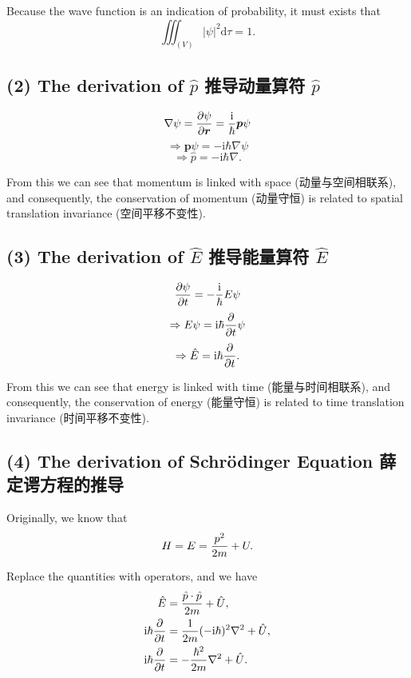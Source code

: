 Because the wave function is an indication of probability, it must exists that \[\iiint _{(V)} |\psi|^2 \mathrm d\tau=1.\]

\subsection*{(2) The derivation of \(\hat p\) 推导动量算符 \(\hat p\)}\label{the-derivation-of-hat-p-ux63a8ux5bfcux52a8ux91cfux7b97ux7b26-hat-p}

\[\nabla \psi = {\partial \psi \over \partial \boldsymbol r} = {\mathrm i \over \hbar}\boldsymbol p \psi\] \[\Rightarrow \boldsymbol p \psi = -\mathrm i \hbar \nabla \psi\] \[\Rightarrow \hat p = -\mathrm i \hbar \nabla.\]

From this we can see that momentum is linked with space (动量与空间相联系), and consequently, the conservation of momentum (动量守恒) is related to spatial translation invariance (空间平移不变性).

\subsection*{(3) The derivation of \(\hat E\) 推导能量算符 \(\hat E\)}\label{the-derivation-of-hat-e-ux63a8ux5bfcux80fdux91cfux7b97ux7b26-hat-e}

\[{\partial \psi \over \partial t} = -{\mathrm i \over \hbar}E \psi\] \[\Rightarrow E \psi = \mathrm i \hbar {\partial \over \partial t} \psi\] \[\Rightarrow \hat E = \mathrm i \hbar {\partial \over \partial t}.\]

From this we can see that energy is linked with time (能量与时间相联系), and consequently, the conservation of energy (能量守恒) is related to time translation invariance (时间平移不变性).

\subsection*{(4) The derivation of Schrödinger Equation 薛定谔方程的推导}\label{the-derivation-of-schruxf6dinger-equation-ux859bux5b9aux8c14ux65b9ux7a0bux7684ux63a8ux5bfc-1}

Originally, we know that \[H = E = {p^2 \over 2m} + U.\]

Replace the quantities with operators, and we have \begin{align*}
    \hat E & = {\hat p \cdot \hat p \over 2m} + \hat U, \\
    \mathrm i \hbar {\partial \over \partial t} & = {1 \over 2m} (-\mathrm i \hbar)^2 \nabla^2 + \hat U, \\
    \mathrm i \hbar {\partial \over \partial t} & = -{\hbar^2 \over 2m} \nabla^2 + \hat U.
\end{align*}

